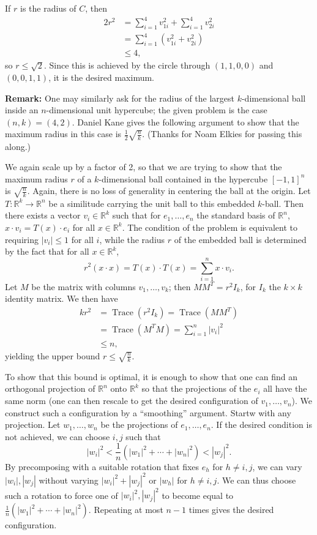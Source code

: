 \documentclass[amssymb,twocolumn,pra,10pt,aps]{revtex4-1}
\newcommand{\RR}{\mathbb{R}}
\DeclareMathOperator{\Trace}{Trace}
\begin{document}
\begin{itemize}
If $r$ is the radius of $C$, then
\begin{align*}
2 r^2 &= \sum_{i=1}^4 v_{1i}^2 + \sum_{i=1}^4 v_{2i}^2 \\
&= \sum_{i=1}^4 (v_{1i}^2 + v_{2i}^2) \\
&\leq 4,
\end{align*}
so $r \leq \sqrt{2}$.
Since this is achieved by the circle
through $(1,1,0,0)$ and $(0,0,1,1)$,
it is the desired maximum.

\textbf{Remark:}
One may similarly ask for the radius of the largest $k$-dimensional
ball inside an $n$-dimensional unit hypercube; the given problem is
the case $(n,k) = (4,2)$.
Daniel Kane gives the following argument to show that the maximum radius
in this case is $\frac{1}{2} \sqrt{\frac{n}{k}}$.
(Thanks for Noam Elkies for passing this along.)

We again scale up by a factor of 2, so that we are trying to show that
the maximum radius $r$ of a $k$-dimensional ball contained in the hypercube
$[-1,1]^n$ is $\sqrt{\frac{n}{k}}$. Again, there is no loss of generality
in centering the ball at the origin. Let $T: \RR^k \to \RR^n$ be a
similitude carrying the unit ball to this embedded $k$-ball.
Then there exists a vector $v_i \in \RR^k$ such that
for $e_1,\dots,e_n$ the standard basis of $\RR^n$,
$x \cdot v_i = T(x) \cdot e_i$ for all $x \in \RR^k$.
The condition of the problem is equivalent to requiring
$|v_i| \leq 1$ for all $i$, while the radius $r$ of the embedded ball
is determined by the fact that for all $x \in \RR^k$,
\[
r^2 (x \cdot x) = T(x) \cdot T(x) = \sum_{i=1}^n x \cdot v_i.
\]
Let $M$ be the matrix with columns $v_1,\dots,v_k$; then $MM^T = r^2 I_k$,
for $I_k$ the $k \times k$ identity matrix. We then have
\begin{align*}
kr^2 &= \Trace(r^2 I_k) = \Trace(MM^T)\\
&= \Trace(M^TM) = \sum_{i=1}^n |v_i|^2 \\
&\leq n,
\end{align*}
yielding the upper bound $r \leq \sqrt{\frac{n}{k}}$.

To show that this bound is optimal, it is enough to show that one can
find an orthogonal projection of $\RR^n$ onto $\RR^k$ so that the
projections of the $e_i$ all have the same norm (one can then rescale
to get the desired configuration of  $v_1,\dots,v_n$). We construct
such a configuration by a ``smoothing'' argument. Startw with any
projection.
Let $w_1,\dots,w_n$ be the projections of $e_1,\dots,e_n$.
If the desired condition is not
achieved, we can choose $i,j$ such that
\[
|w_i|^2 < \frac{1}{n} (|w_1|^2 + \cdots + |w_n|^2) < |w_j|^2.
\]
By precomposing
with a suitable rotation that fixes $e_h$ for $h \neq i,j$,
we can vary $|w_i|, |w_j|$ without varying $|w_i|^2 + |w_j|^2$
or $|w_h|$ for $h \neq i,j$. We can thus choose such a rotation to
force one of $|w_i|^2, |w_j|^2$ to become equal to
$\frac{1}{n} (|w_1|^2 + \cdots + |w_n|^2)$.
Repeating at most $n-1$ times gives the desired configuration.


\end{itemize}
\end{document}
